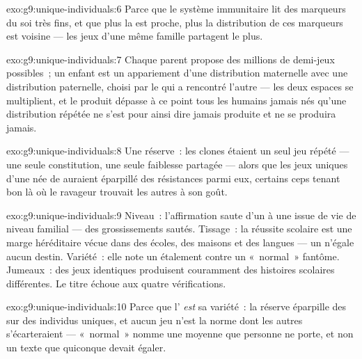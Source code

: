 \begin{solution}{exo:g9:unique-individuals:6}
Parce que le système immunitaire lit des marqueurs du soi
très fins, et que plus la  est proche, plus la
distribution de ces marqueurs est voisine --- les jeux d'une
même famille partagent le plus.
\end{solution}

\begin{solution}{exo:g9:unique-individuals:7}
Chaque parent propose des millions de demi-jeux possibles~;
un enfant est un appariement d'une distribution maternelle
avec une distribution paternelle, choisi par le  qui a
rencontré l'autre --- les deux espaces se multiplient, et le
produit dépasse à ce point tous les humains jamais nés
qu'une distribution répétée ne s'est pour ainsi dire jamais
produite et ne se produira jamais.
\end{solution}

\begin{solution}{exo:g9:unique-individuals:8}
Une réserve~: les clones étaient un seul jeu répété --- une
seule constitution, une seule faiblesse partagée --- alors
que les jeux uniques d'une  née de 
auraient éparpillé des résistances parmi eux, certains ceps
tenant bon là où le ravageur trouvait les autres à son goût.
\end{solution}

\begin{solution}{exo:g9:unique-individuals:9}
Niveau~: l'affirmation saute d'un  à une issue de vie de
niveau familial --- des grossissements sautés. Tissage~: la
réussite scolaire est une marge héréditaire vécue dans des
écoles, des maisons et des langues --- un  n'égale aucun
destin. Variété~: elle note un étalement contre un
«~normal~» fantôme. Jumeaux~: des jeux identiques produisent
couramment des histoires scolaires différentes. Le titre
échoue aux quatre vérifications.
\end{solution}

\begin{solution}{exo:g9:unique-individuals:10}
Parce que l' \emph{est} sa variété~: la réserve
éparpille des  sur des individus uniques, et aucun
jeu n'est la norme dont les autres s'écarteraient ---
«~normal~» nomme une moyenne que personne ne porte, et non
un texte que quiconque devait égaler.
\end{solution}

